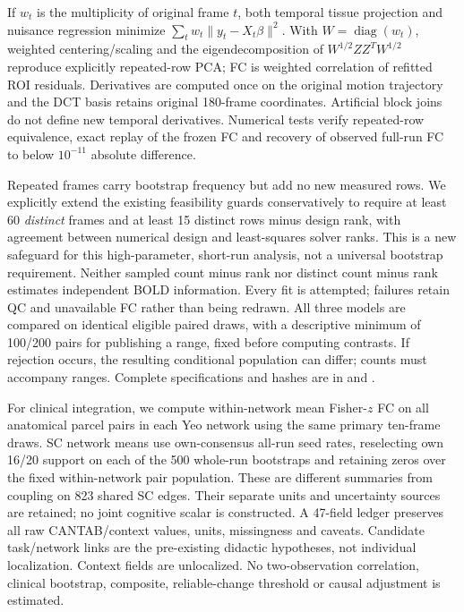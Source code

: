 \documentclass[11pt,a4paper]{article}
\begin{document}
If $w_t$ is the multiplicity of original frame $t$, both temporal tissue projection and nuisance regression minimize $\sum_t w_t\lVert y_t-X_t\beta\rVert^2$. With $W=\operatorname{diag}(w_t)$, weighted centering/scaling and the eigendecomposition of $W^{1/2}ZZ^TW^{1/2}$ reproduce explicitly repeated-row PCA; FC is weighted correlation of refitted ROI residuals. Derivatives are computed once on the original motion trajectory and the DCT basis retains original 180-frame coordinates. Artificial block joins do not define new temporal derivatives. Numerical tests verify repeated-row equivalence, exact replay of the frozen FC and recovery of observed full-run FC to below $10^{-11}$ absolute difference.

Repeated frames carry bootstrap frequency but add no new measured rows. We explicitly extend the existing feasibility guards conservatively to require at least 60 \emph{distinct} frames and at least 15 distinct rows minus design rank, with agreement between numerical design and least-squares solver ranks. This is a new safeguard for this high-parameter, short-run analysis, not a universal bootstrap requirement. Neither sampled count minus rank nor distinct count minus rank estimates independent BOLD information. Every fit is attempted; failures retain QC and unavailable FC rather than being redrawn. All three models are compared on identical eligible paired draws, with a descriptive minimum of 100/200 pairs for publishing a range, fixed before computing contrasts. If rejection occurs, the resulting conditional population can differ; counts must accompany ranges. Complete specifications and hashes are in  and .

For clinical integration, we compute within-network mean Fisher-$z$ FC on all anatomical parcel pairs in each Yeo network using the same primary ten-frame draws. SC network means use own-consensus all-run seed rates, reselecting own 16/20 support on each of the 500 whole-run bootstraps and retaining zeros over the fixed within-network pair population. These are different summaries from coupling on 823 shared SC edges. Their separate units and uncertainty sources are retained; no joint cognitive scalar is constructed. A 47-field ledger preserves all raw CANTAB/context values, units, missingness and caveats. Candidate task/network links are the pre-existing didactic hypotheses, not individual localization. Context fields are unlocalized. No two-observation correlation, clinical bootstrap, composite, reliable-change threshold or causal adjustment is estimated.
\end{document}

